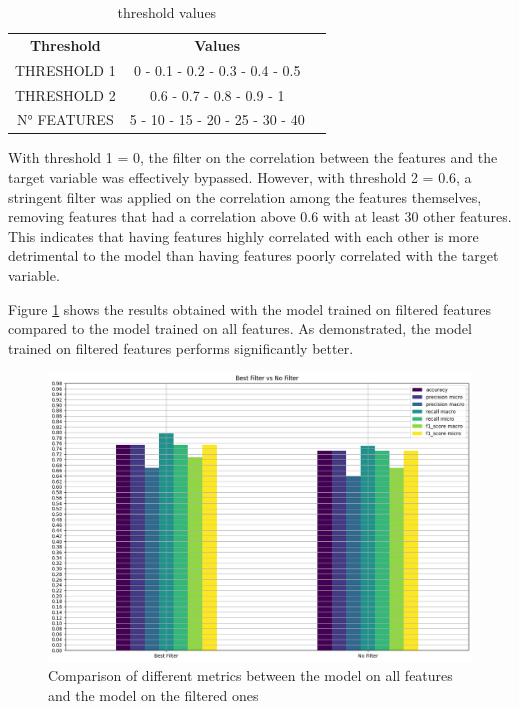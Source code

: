 \begin{table}[h]
    \centering
    \small
    \begin{tabular}{|c|c|c|}
        \hline
        \textbf{Threshold} & \textbf{Values}                 \\
        THRESHOLD 1        & 0 - 0.1 - 0.2 - 0.3 - 0.4 - 0.5 \\
        THRESHOLD 2        & 0.6 - 0.7 - 0.8 - 0.9 - 1       \\
        N° FEATURES        & 5 - 10 - 15 - 20 - 25 - 30 - 40 \\
        \hline
    \end{tabular}
    \caption{threshold values}
    \label{tab:threshold_values}
\end{table}

With threshold 1 = 0, the filter on the correlation between the features and the target variable was effectively bypassed. However, with threshold 2 = 0.6, a stringent filter was applied on the correlation among the features themselves, removing features that had a correlation above 0.6 with at least 30 other features. This indicates that having features highly correlated with each other is more detrimental to the model than having features poorly correlated with the target variable.

Figure \ref{fig:comparison_model_on_all_features_vs_model_on_best} shows the results obtained with the model trained on filtered features compared to the model trained on all features. As demonstrated, the model trained on filtered features performs significantly better.

\begin{figure}[H]
    \centering
    \includegraphics[width=0.8\columnwidth]{../images/model_on_all_features_vs_model_on_best.png}
    \caption{Comparison of different metrics between the model on all features and the model on the filtered ones}
    \label{fig:comparison_model_on_all_features_vs_model_on_best}
\end{figure}

